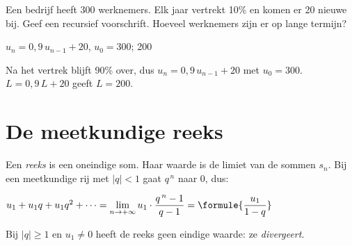 

\begin{oefeningen}
\begin{oefening}
Een bedrijf heeft 300 werknemers. Elk jaar vertrekt 10\% en komen er 20 nieuwe bij. Geef een recursief voorschrift. Hoeveel werknemers zijn er op lange termijn?
\begin{solution}
$u_n=0{,}9\,u_{n-1}+20$, $u_0=300$; 200
\end{solution}
\begin{fullsolution}
Na het vertrek blijft 90\% over, dus $u_n=0{,}9\,u_{n-1}+20$ met $u_0=300$. $L=0{,}9\,L+20$ geeft $L=200$.
\end{fullsolution}
\end{oefening}
\end{oefeningen}

\section{De meetkundige reeks}

\begin{theorie}
Een \emph{reeks} is een oneindige som. Haar waarde is de limiet van de sommen $s_n$. Bij een meetkundige rij met $|q| < 1$ gaat $q^{\,n}$ naar 0, dus:

\vspace{1mm}
\qquad $u_1 + u_1 q + u_1 q^2 + \cdots = \displaystyle\lim_{n\to+\infty} u_1 \cdot \frac{q^{\,n} - 1}{q - 1} = \formule{\dfrac{u_1}{1 - q}}$

\vspace{1.5mm}
Bij $|q| \geqslant 1$ en $u_1 \neq 0$ heeft de reeks geen eindige waarde: ze \emph{divergeert}.
\end{theorie}


